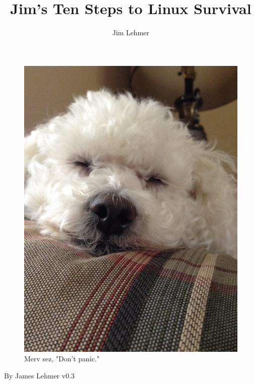 \documentclass[10pt,]{book}
\title{Jim's Ten Steps to Linux Survival}
\author{Jim Lehmer}
\date{}
\numberwithin{figure}{chapter}
\begin{document}
\maketitle

{
\hypersetup{linkcolor=black}
\setcounter{tocdepth}{3}
\tableofcontents
}

{
\listoffigures
}

\ifxetex
\section*{} \pagestyle{empty}

\begin{figure}[!htbp]
\includegraphics{./images/Merv.jpg}%
\caption*{Merv sez, "Don't panic."}%
\end{figure}

\cleardoublepage
By James Lehmer \newline
\newline
v0.3 \newline
\newline
\end{document}
